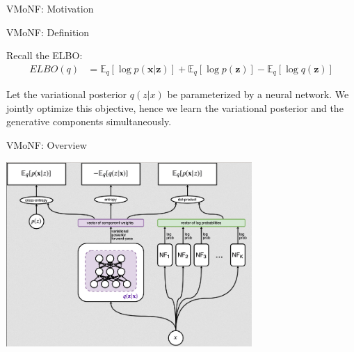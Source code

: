 \documentclass[12pt,ignorenonframetext,]{beamer}
\begin{document}
\begin{frame}{VMoNF: Motivation}
\protect\hypertarget{vmonf-motivation}{}



\end{frame}

\begin{frame}{VMoNF: Definition}
\protect\hypertarget{vmonf-definition}{}

Recall the ELBO: \begin{align*}
    ELBO(q) &= \mathbb{E}_q [\log p(\bm{x}|\bm{z})] + \mathbb{E}_q [\log p(\bm{z})] - \mathbb{E}_q [\log q(\bm{z})]
\end{align*}

\pause

Let the variational posterior \(q(z|x)\) be parameterized by a neural
network. We jointly optimize this objective, hence we learn the
variational posterior and the generative components simultaneously.

\end{frame}

\begin{frame}{VMoNF: Overview}
\protect\hypertarget{vmonf-overview}{}

\centering

\includegraphics[width=0.7\textwidth]{figures/train_overview.png}

\end{frame}
\end{document}

